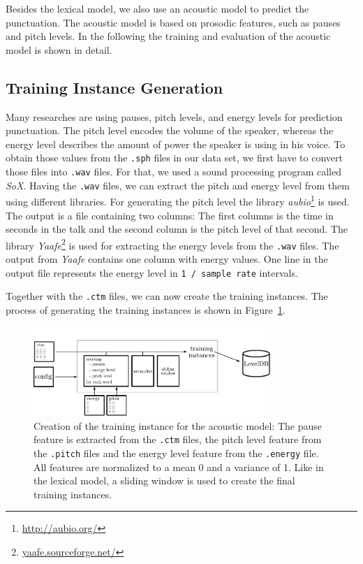 Besides the lexical model, we also use an acoustic model to predict the punctuation.
The acoustic model is based on prosodic features, such as pauses and pitch levels.
In the following the training and evaluation of the acoustic model is shown in detail.

\subsection{Training Instance Generation}

Many researches are using pauses, pitch levels, and energy levels for prediction punctuation.
The pitch level encodes the volume of the speaker, whereas the energy level describes the amount of power the speaker is using in his voice.
To obtain those values from the \texttt{.sph} files in our data set, we first have to convert those files into \texttt{.wav} files.
For that, we used a sound processing program called \emph{SoX}.
Having the \texttt{.wav} files, we can extract the pitch and energy level from them using different libraries.
For generating the pitch level the library \emph{aubio}\footnote{\url{http://aubio.org/}} is used.
The output is a file containing two columns: The first columns is the time in seconds in the talk and the second column is the pitch level of that second.
The library \emph{Yaafe}\footnote{\url{yaafe.sourceforge.net/}} is used for extracting the energy levels from the \texttt{.wav} files.
The output from \emph{Yaafe} contains one column with energy values.
One line in the output file represents the energy level in \texttt{1 / sample rate} intervals.

Together with the \texttt{.ctm} files, we can now create the training instances.
The process of generating the training instances is shown in Figure~\ref{fig:overview_acoustic}.

\begin{figure}[ht]
    \centering
    \includegraphics[width=0.8\textwidth]{img/overview_accoustic.pdf}
    \caption{Creation of the training instance for the acoustic model: The pause feature is extracted from the \texttt{.ctm} files, the pitch level feature from the \texttt{.pitch} files and the energy level feature from the \texttt{.energy} file. All features are normalized to a mean 0 and a variance of 1. Like in the lexical model, a sliding window is used to create the final training instances.}
    \label{fig:overview_acoustic}
\end{figure}

